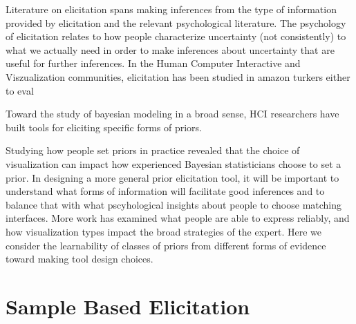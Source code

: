 Literature on elicitation spans making inferences from the type of information provided by elicitation and the relevant psychological literature.  
The psychology of elicitation relates to how people characterize uncertainty (not consistently) to what we actually need in order to make inferences about uncertainty that are useful for further inferences. 
In the Human Computer Interactive and Viszualization communities, elicitation has been studied in amazon turkers either to eval


Toward the study of bayesian modeling in a broad sense, HCI researchers have built tools for eliciting specific forms of priors. 

Studying how people set priors in practice revealed that the choice of visualization can impact how experienced Bayesian statisticians choose to set a prior. 
In designing a more general prior elicitation tool, it will be important to understand what forms of information will facilitate good inferences and to balance that with what pscyhological insights about people to choose matching interfaces.  
More work has examined what people are able to express reliably, and how visualization types impact the broad strategies of the expert. 
Here we consider the learnability of classes of priors from different forms of evidence toward making tool design choices. 


\section{Sample Based Elicitation}

